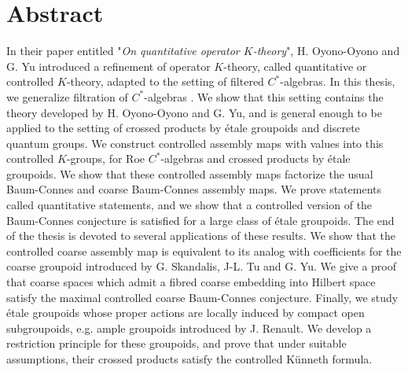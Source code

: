 \section*{Abstract}
In their paper entitled "\textit{On quantitative operator $K$-theory}", H. Oyono-Oyono and G. Yu introduced a refinement of operator $K$-theory, called quantitative or controlled $K$-theory, adapted to the setting of filtered $C^*$-algebras. In this thesis, we generalize filtration of $C^*$-algebras . We show that this setting contains the theory developed by H. Oyono-Oyono and G. Yu, and is general enough to be applied to the setting of crossed products by étale groupoids and discrete quantum groups. We construct controlled assembly maps with values into this controlled $K$-groups, for Roe $C^*$-algebras and crossed products by étale groupoids. We show that these controlled assembly maps factorize the usual Baum-Connes and coarse Baum-Connes assembly maps. We prove statements called quantitative statements, and we show that a controlled version of the Baum-Connes conjecture is satisfied for a large class of étale groupoids. The end of the thesis is devoted to several applications of these results. We show that the controlled coarse assembly map is equivalent to its analog with coefficients for the coarse groupoid introduced by G. Skandalis, J-L. Tu and G. Yu. We give a proof that coarse spaces which admit a fibred coarse embedding into Hilbert space satisfy the maximal controlled coarse Baum-Connes conjecture. Finally, we study étale groupoids whose proper actions are locally induced by compact open subgroupoids, e.g. ample groupoids introduced by J. Renault. We develop a restriction principle for these groupoids, and prove that under suitable assumptions, their crossed products satisfy the controlled Künneth formula.



